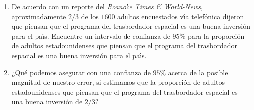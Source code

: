 \begin{enunciado}
 $\phantom{0}$
 \begin{enumerate}
  \item De acuerdo con un reporte del \textit{Roanoke Times \& World-News}, aproximadamente $2/3$ de los $1600$ adultos encuestados v\'{\i}a telef\'onica dijeron que piensan que el programa del trasbordador espacial es una buena inversi\'on para el pa\'{\i}s. Encuentre un intervalo de confianza de $95\%$ para la proporci\'on de adultos estadounidenses que piensan que el programa del trasbordador espacial es una buena inversi\'on para el pa\'{\i}s.
  \item ¿Qu\'e podemos asegurar con una confianza de $95\%$ acerca de la posible magnitud de nuestro error, si estimamos que la proporci\'on de adultos estadounidenses que piensan que el programa del trasbordador espacial es una buena inversi\'on de $2/3$?
 \end{enumerate}
\end{enunciado}

